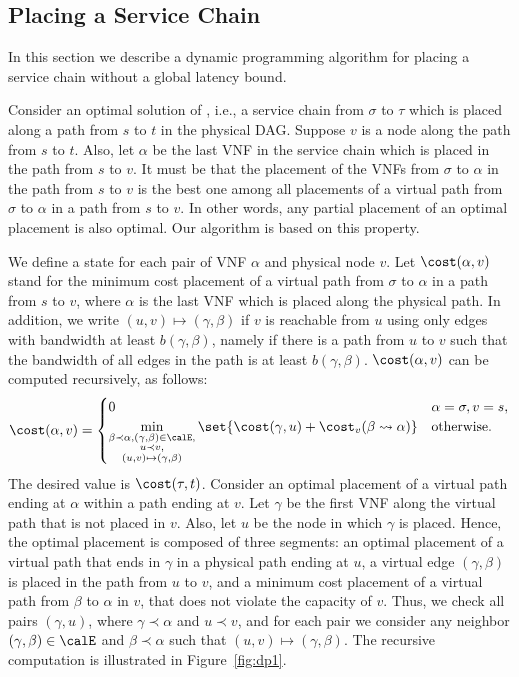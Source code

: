 
\subsection{Placing a Service Chain}
\label{sec:chain-placement}

In this section we describe a dynamic programming algorithm for
placing a service chain without a global latency bound.  

Consider an optimal solution of \scp, i.e., a service chain from
$\sigma$ to $\tau$ which is placed along a path from $s$ to $t$ in the
physical DAG.  Suppose $v$ is a node along the path from $s$ to $t$.
Also, let $\alpha$ be the last VNF in the service chain which is
placed in the path from $s$ to $v$.  It must be that the placement of
the VNFs from $\sigma$ to $\alpha$ in the path from $s$ to $v$ is the
best one among all placements of a virtual path from $\sigma$ to
$\alpha$ in a path from $s$ to $v$.  In other words, any partial
placement of an optimal placement is also optimal.  Our algorithm is
based on this property.

We define a state for each pair of VNF $\alpha$ and physical node $v$.
Let $\cost(\alpha,v)$ stand for the minimum cost placement of a
virtual path from $\sigma$ to $\alpha$ in a path from $s$ to $v$,
where $\alpha$ is the last VNF which is placed along the physical
path.
%
In addition, we write $(u, v) \mapsto (\gamma,\beta)$ if $v$ is
reachable from $u$ using only edges with bandwidth at least
$b(\gamma,\beta)$, namely if there is a path from $u$ to $v$ such that
the bandwidth of all edges in the path is at least $b(\gamma,\beta)$.
%
$\cost(\alpha,v)$ can be computed recursively, as follows:
\[
\cost(\alpha,v) =
\begin{cases}
0 & \alpha = \sigma, v = s, \\
\displaystyle
\min_{
  \substack{\beta \prec \alpha, (\gamma,\beta) \in \calE, \\
           u \prec v, \\
         (u,v) \mapsto (\gamma,\beta)}
     }
  \set{\cost(\gamma,u) + \cost_v(\beta \leadsto \alpha)}
  & \text{otherwise}.
\end{cases}
\]
The desired value is $\cost(\tau,t)$.
%
Consider an optimal placement of a virtual path ending at $\alpha$
within a path ending at $v$.  Let $\gamma$ be the first VNF along the
virtual path that is not placed in $v$.  Also, let $u$ be the node in
which $\gamma$ is placed.  Hence, the optimal placement is composed of
three segments: an optimal placement of a virtual path that ends in
$\gamma$ in a physical path ending at $u$, a virtual edge
$(\gamma,\beta)$ is placed in the path from $u$ to $v$, and a minimum
cost placement of a virtual path from $\beta$ to $\alpha$ in $v$, that
does not violate the capacity of $v$.
%
Thus, we check all pairs $(\gamma,u)$, where $\gamma \prec \alpha$ and
$u \prec v$, and for each pair we consider any neighbor
$(\gamma,\beta) \in \calE$ and $\beta \prec \alpha$ such that $(u, v)
\mapsto (\gamma,\beta)$.
%
The recursive computation is illustrated in Figure~\ref{fig:dp1}.


